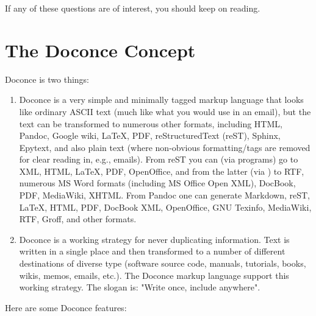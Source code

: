 \documentclass[twoside]{book}
\begin{document}
\noindent
If any of these questions are of interest, you should keep on reading.


\section{The Doconce Concept}

Doconce is two things:

\begin{enumerate}
 \item Doconce is a very simple and minimally tagged markup language that
    looks like ordinary ASCII text (much like what you would use in an
    email), but the text can be transformed to numerous other formats,
    including HTML, Pandoc, Google wiki, {\LaTeX}, PDF, reStructuredText
    (reST), Sphinx, Epytext, and also plain text (where non-obvious
    formatting/tags are removed for clear reading in, e.g.,
    emails). From reST you can (via  programs) go to XML, HTML,
    {\LaTeX}, PDF, OpenOffice, and from the latter (via ) to
    RTF, numerous MS Word formats (including MS Office Open XML),
    DocBook, PDF, MediaWiki, XHTML. From Pandoc one can generate
    Markdown, reST, {\LaTeX}, HTML, PDF, DocBook XML, OpenOffice, GNU
    Texinfo, MediaWiki, RTF, Groff, and other formats.

 \item Doconce is a working strategy for never duplicating information.
    Text is written in a single place and then transformed to
    a number of different destinations of diverse type (software
    source code, manuals, tutorials, books, wikis, memos, emails, etc.).
    The Doconce markup language support this working strategy.
    The slogan is: "Write once, include anywhere".
\end{enumerate}

\noindent
Here are some Doconce features:
\end{document}
